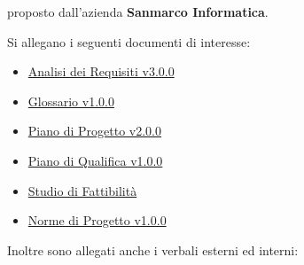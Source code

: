 \documentclass[10pt]{article}
\begin{document}
proposto dall’azienda \textbf{Sanmarco Informatica}.


Si allegano i seguenti documenti di interesse:
\begin{itemize}
  \item \href{https://github.com/7clickers/Documentazione-7clickers/blob/main/RTB/documentazione_esterna/analisi_dei_requisiti_v3.0.0.pdf}{Analisi dei Requisiti v3.0.0}
  \item \href{https://github.com/7clickers/Documentazione-7clickers/blob/main/RTB/documentazione_esterna/glossario_v1.0.0.pdf}{Glossario v1.0.0}
  \item \href{https://github.com/7clickers/Documentazione-7clickers/blob/main/RTB/documentazione_esterna/piano_di_progetto_v2.0.0.pdf}{Piano di Progetto v2.0.0}
  \item \href{https://github.com/7clickers/Documentazione-7clickers/blob/main/RTB/documentazione_esterna/piano_di_qualifica_v1.0.0.pdf}{Piano di Qualifica v1.0.0}
  \item \href{https://github.com/7clickers/Documentazione-7clickers/blob/main/RTB/documentazione_interna/studio_di_fattibilita.pdf}{Studio di Fattibilità}
  \item \href{https://github.com/7clickers/Documentazione-7clickers/blob/main/RTB/documentazione_interna/norme_di_progetto_v1.0.0.pdf}{Norme di Progetto v1.0.0}
\end{itemize}

Inoltre sono allegati anche i verbali esterni ed interni:
\end{document}
